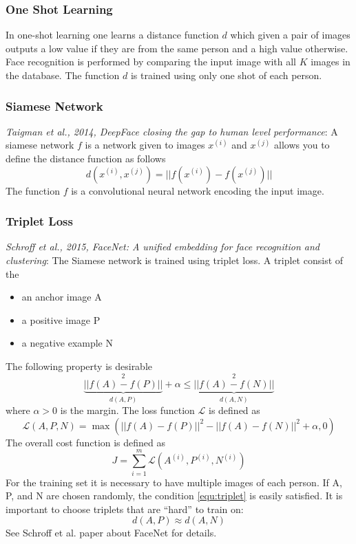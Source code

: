 \documentclass{article}
\begin{document}
\subsubsection{One Shot Learning}
In one-shot learning one learns a distance function $d$
which given a pair of images outputs a low value if they are from the same person and a high value otherwise.
Face recognition is performed by comparing the input image with all $K$ images in the database.
The function $d$ is trained using only one shot of each person.

\subsubsection{Siamese Network}\label{cha:siamese}
\emph{Taigman et al., 2014, DeepFace closing the gap to human level performance}:
A siamese network $f$ is a network given to images $x^{(i)}$ and $x^{(j)}$ allows you to define the distance function as follows
\begin{equation}
  d(x^{(i)},x^{(j)}) = ||f(x^{(i)})-f(x^{(j)})||
\end{equation}
The function $f$ is a convolutional neural network encoding the input image.

\subsubsection{Triplet Loss}
\emph{Schroff et al., 2015, FaceNet: A unified embedding for face recognition and clustering}:
The Siamese network is trained using triplet loss.
A triplet consist of the
\begin{itemize}
  \item an anchor image A
  \item a positive image P
  \item a negative example N
\end{itemize}
The following property is desirable
\begin{equation}\label{equ:triplet}
  \underbrace{||f(A)-f(P)||}_{d(A,P)}^2 + \alpha \le \underbrace{||f(A)-f(N)||}_{d(A,N)}^2
\end{equation}
where $\alpha>0$ is the margin.
The loss function $\mathcal{L}$ is defined as
\begin{equation}
  \mathcal{L}(A,P,N)=\max(||f(A)-f(P)||^2-||f(A)-f(N)||^2+\alpha, 0)
\end{equation}
The overall cost function is defined as
\begin{equation}
  J=\sum_{i=1}^m\mathcal{L}(A^{(i)},P^{(i)},N^{(i)})
\end{equation}
For the training set it is necessary to have multiple images of each person.
If A, P, and N are chosen randomly, the condition \cref{equ:triplet} is easily satisfied.
It is important to choose triplets that are ``hard'' to train on:
\begin{equation}
  d(A, P)\approx d(A, N)
\end{equation}
See Schroff et al. paper about FaceNet for details.
\end{document}
